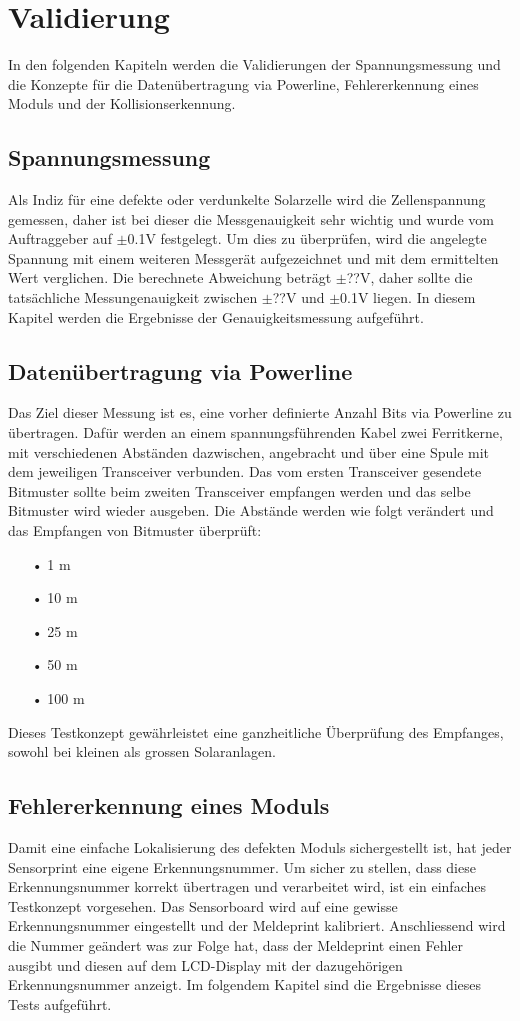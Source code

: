 \section{Validierung}
In den folgenden Kapiteln werden die Validierungen der Spannungsmessung und die Konzepte für die Datenübertragung via Powerline, Fehlererkennung eines Moduls und der Kollisionserkennung.
\subsection{Spannungsmessung}
Als Indiz für eine defekte oder verdunkelte Solarzelle wird die Zellenspannung gemessen, daher ist bei dieser die Messgenauigkeit sehr wichtig und wurde vom Auftraggeber auf $\pm$0.1V festgelegt. Um dies zu überprüfen, wird die angelegte Spannung mit einem weiteren Messgerät aufgezeichnet und mit dem ermittelten Wert verglichen. Die berechnete Abweichung beträgt $\pm$??V, daher sollte die tatsächliche Messungenauigkeit zwischen $\pm$??V und $\pm$0.1V liegen. In diesem Kapitel werden die Ergebnisse der Genauigkeitsmessung aufgeführt.
\subsection{Datenübertragung via Powerline}
Das Ziel dieser Messung ist es, eine vorher definierte Anzahl Bits via Powerline zu übertragen. Dafür werden an einem spannungsführenden Kabel zwei Ferritkerne, mit verschiedenen Abständen dazwischen, angebracht und über eine Spule mit dem jeweiligen Transceiver verbunden. Das vom ersten Transceiver gesendete Bitmuster sollte beim zweiten Transceiver empfangen werden und das selbe Bitmuster wird wieder ausgeben.
Die Abstände werden wie folgt verändert und das Empfangen von Bitmuster überprüft:
\begin{enumerate}
\item[•]1 m
\item[•]10 m
\item[•]25 m
\item[•]50 m
\item[•]100 m
\end{enumerate}
Dieses Testkonzept gewährleistet eine ganzheitliche Überprüfung des Empfanges, sowohl bei kleinen als grossen Solaranlagen.
\subsection{Fehlererkennung eines Moduls}
Damit eine einfache Lokalisierung des defekten Moduls sichergestellt ist, hat jeder Sensorprint eine eigene Erkennungsnummer. Um sicher zu stellen, dass diese Erkennungsnummer korrekt übertragen und verarbeitet wird, ist ein einfaches Testkonzept vorgesehen. Das Sensorboard wird auf eine gewisse Erkennungsnummer eingestellt und der Meldeprint kalibriert. Anschliessend wird die Nummer geändert was zur Folge hat, dass der Meldeprint einen Fehler ausgibt und diesen auf dem LCD-Display mit der dazugehörigen Erkennungsnummer anzeigt. Im folgendem Kapitel sind die Ergebnisse dieses Tests aufgeführt.
